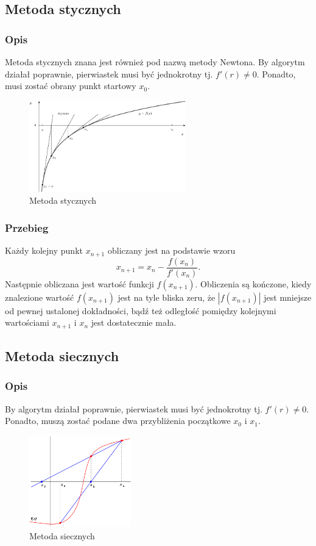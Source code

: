\documentclass[12pt]{article}
\begin{document}
\subsection{Metoda stycznych}
\subsubsection{Opis}
Metoda stycznych znana jest również pod nazwą metody Newtona. By algorytm działał poprawnie, pierwiastek musi być jednokrotny tj. $f'(r)\neq0$. Ponadto, musi zostać obrany punkt startowy $x_0$.
\begin{figure}[!htbp]
    \centering
    \includegraphics[height=150px]{newton_method.png}
    \caption{Metoda stycznych}
    \label{fig:tangent}
\end{figure}
\subsubsection{Przebieg}
Każdy kolejny punkt $x_{n+1}$ obliczany jest na podstawie wzoru $$x_{n+1}=x_n-\frac{f(x_n)}{f'(x_n)}.$$ Następnie obliczana jest wartość funkcji $f(x_{n+1})$. Obliczenia są kończone, kiedy znalezione wartość $f(x_{n+1})$ jest na tyle bliska zeru, że $|f(x_{n+1})|$ jest mniejsze od pewnej ustalonej dokładności, bądź też odległość pomiędzy kolejnymi wartościami $x_{n+1}$ i $x_n$ jest dostatecznie mała.

\subsection{Metoda siecznych}
\subsubsection{Opis}
By algorytm działał poprawnie, pierwiastek musi być jednokrotny tj. $f'(r)\neq0$. Ponadto, muszą zostać podane dwa przybliżenia początkowe $x_0$ i $x_1$.
\begin{figure}[!htbp]
    \centering
    \includegraphics[height=150px]{secant_method.png}
    \caption{Metoda siecznych}
    \label{fig:secant}
\end{figure}
\end{document}
